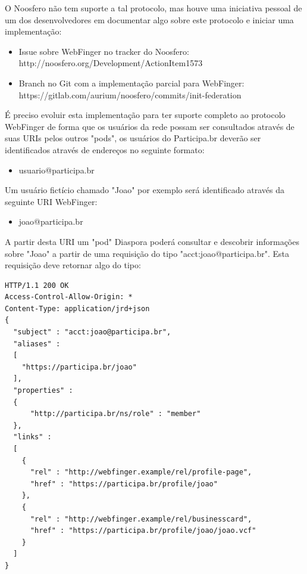 \documentclass[12pt]{article}
\begin{document}
O Noosfero não tem suporte a tal protocolo, mas houve uma iniciativa pessoal
de um dos desenvolvedores em documentar algo sobre este protocolo e iniciar
uma implementação:

\begin{itemize}
  \item Issue sobre WebFinger no tracker do Noosfero: \\
    http://noosfero.org/Development/ActionItem1573
  \item Branch no Git com a implementação parcial para WebFinger: \\
    https://gitlab.com/aurium/noosfero/commits/init-federation
\end{itemize}

É preciso evoluir esta implementação para ter suporte completo ao protocolo
WebFinger de forma que os usuários da rede possam ser consultados através de
suas URIs pelos outros "pods", os usuários do Participa.br deverão ser
identificados através de endereços no seguinte formato:

\begin{itemize}
  \item usuario@participa.br
\end{itemize}

Um usuário fictício chamado "Joao" por exemplo será identificado através da
seguinte URI WebFinger:

\begin{itemize}
  \item joao@participa.br
\end{itemize}

A partir desta URI um "pod" Diaspora poderá consultar e descobrir informações
sobre "Joao" a partir de uma requisição do tipo "acct:joao@participa.br". Esta
requisição deve retornar algo do tipo:


\begin{framed}
\begin{lstlisting}[caption=Exemplo resposta a consulta WebFinger]
HTTP/1.1 200 OK
Access-Control-Allow-Origin: *
Content-Type: application/jrd+json
{
  "subject" : "acct:joao@participa.br",
  "aliases" :
  [
    "https://participa.br/joao"
  ],
  "properties" :
  {
      "http://participa.br/ns/role" : "member"
  },
  "links" :
  [
    {
      "rel" : "http://webfinger.example/rel/profile-page",
      "href" : "https://participa.br/profile/joao"
    },
    {
      "rel" : "http://webfinger.example/rel/businesscard",
      "href" : "https://participa.br/profile/joao/joao.vcf"
    }
  ]
}
\end{lstlisting}
\end{framed}
\end{document}
